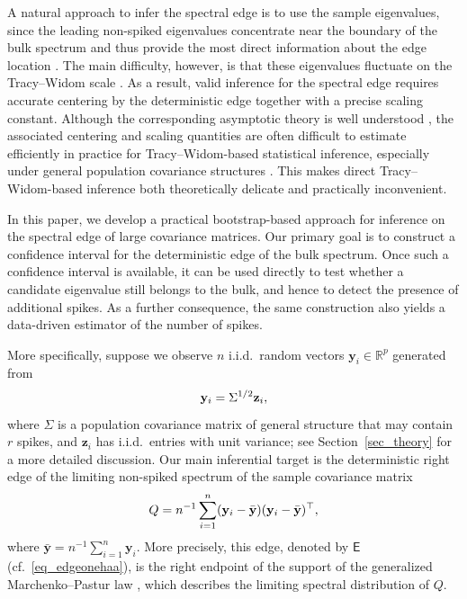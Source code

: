 \documentclass[12pt]{article}
\def\yb{\mathbf y}
\def\zb{\mathbf z}
\theoremstyle{plain}
\numberwithin{equation}{section}
\begin{document}
A natural approach to infer the spectral edge is to use the sample eigenvalues, since the leading non-spiked eigenvalues concentrate near the boundary of the bulk spectrum and thus provide the most direct information about the edge location \citep{BaiSilverstein2010, knowles2017anisotropic,ErdosYau2017,bloemendal2016principal}. The main difficulty, however, is that these eigenvalues fluctuate on the Tracy--Widom scale \citep{tracy1994level,tracy1996orthogonal,Johnstone2001,el2007tracy,lee2016tracy,bloemendal2016principal}. As a result, valid inference for the spectral edge requires accurate centering by the deterministic edge together with a precise scaling constant. Although the corresponding asymptotic theory is well understood \citep{Bao2015,Ding&Yang2018,9779233,Fan2019separable,knowles2017anisotropic}, the associated centering and scaling quantities are often difficult to estimate efficiently in practice for Tracy--Widom-based statistical inference, especially under general population covariance structures \citep{Karoui2009,paul2009no,lee2016tracy}. This makes direct Tracy--Widom-based inference both theoretically delicate and practically inconvenient.



In this paper, we develop a practical bootstrap-based approach for inference on the spectral edge of large covariance matrices. Our primary goal is to construct a confidence interval for the deterministic edge of the bulk spectrum. Once such a confidence interval is available, it can be used directly to test whether a candidate eigenvalue still belongs to the bulk, and hence to detect the presence of additional spikes. As a further consequence, the same construction also yields a data-driven estimator of the number of spikes.

More specifically, suppose we observe $n$ i.i.d.\ random vectors $\yb_i\in\mathbb R^p$ generated from
\vspace*{-10pt}
\begin{equation}
	\vspace*{-10pt}
	\yb_i=\Sigma^{1/2}\zb_i,
	\label{eq_populationfirstdefinition}
\end{equation}
where $\Sigma$ is a population covariance matrix of general structure that may contain $r$ spikes, and $\zb_i$ has i.i.d.\ entries with unit variance; see Section~\ref{sec_theory} for a more detailed discussion. Our main inferential target is the deterministic right edge of the limiting non-spiked spectrum of the sample covariance matrix \vspace*{-10pt}
\begin{equation}\label{eq_matrixsample}
	\vspace*{-10pt}
	Q= n^{-1}\sum_{i=1}^n (\yb_i-\bar{\yb})(\yb_i-\bar{\yb})^\top,
\end{equation}
where $\bar{\yb}=n^{-1}\sum_{i=1}^n \yb_i.$ More precisely, this edge, denoted by $\mathsf{E}$ (cf.\ \eqref{eq_edgeonehaa}), is the right endpoint of the support of the generalized Marchenko--Pastur law \citep{BaiSilverstein2010}, which describes the limiting spectral distribution of $Q$.
\end{document}
